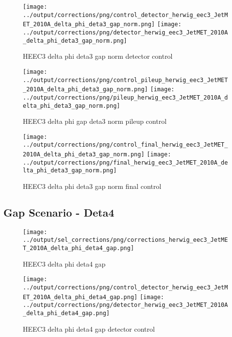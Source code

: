 \documentclass[11pt]{book}
\begin{document}
\begin{figure}[ht]
\centering
\texttt{[image: ../output/corrections/png/control\_detector\_herwig\_eec3\_JetMET\_2010A\_delta\_phi\_deta3\_gap\_norm.png]}
\texttt{[image: ../output/corrections/png/detector\_herwig\_eec3\_JetMET\_2010A\_delta\_phi\_deta3\_gap\_norm.png]}
\caption{HEEC3 delta phi deta3 gap norm detector control}
\label{fig:HEEC3_JetMET_2010A_delta_phi_deta3_gap_norm_detector_control}
\end{figure}

\begin{figure}[ht]
\centering
\texttt{[image: ../output/corrections/png/control\_pileup\_herwig\_eec3\_JetMET\_2010A\_delta\_phi\_deta3\_gap\_norm.png]}
\texttt{[image: ../output/corrections/png/pileup\_herwig\_eec3\_JetMET\_2010A\_delta\_phi\_deta3\_gap\_norm.png]}
\caption{HEEC3 delta phi gap deta3 norm pileup control}
\label{fig:HEEC3_JetMET_2010A_delta_phi_deta3_gap_norm_pileup_control}
\end{figure}


\begin{figure}[ht]
\centering
\texttt{[image: ../output/corrections/png/control\_final\_herwig\_eec3\_JetMET\_2010A\_delta\_phi\_deta3\_gap\_norm.png]}
\texttt{[image: ../output/corrections/png/final\_herwig\_eec3\_JetMET\_2010A\_delta\_phi\_deta3\_gap\_norm.png]}
\caption{HEEC3 delta phi deta3 gap norm final control}
\label{fig:HEEC3_JetMET_2010A_delta_phi_deta3_gap_norm_final_control}
\end{figure}


\clearpage
\subsection{Gap Scenario - Deta4}
\begin{figure}[ht]
\centering
\texttt{[image: ../output/sel\_corrections/png/corrections\_herwig\_eec3\_JetMET\_2010A\_delta\_phi\_deta4\_gap.png]}
\caption{HEEC3 delta phi deta4 gap}
\label{fig:HEEC3_JetMET_2010A_delta_phi_deta4_gap}
\end{figure}

\begin{figure}[ht]
\centering
\texttt{[image: ../output/corrections/png/control\_detector\_herwig\_eec3\_JetMET\_2010A\_delta\_phi\_deta4\_gap.png]}
\texttt{[image: ../output/corrections/png/detector\_herwig\_eec3\_JetMET\_2010A\_delta\_phi\_deta4\_gap.png]}
\caption{HEEC3 delta phi deta4 gap detector control}
\label{fig:HEEC3_JetMET_2010A_delta_phi_deta4_gap_detector_control}
\end{figure}
\end{document}
